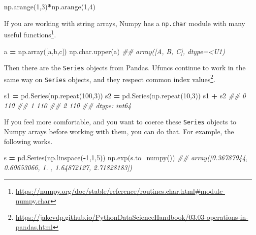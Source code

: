 \documentclass[
  12pt,
  krantz2]{krantz}
\makeatletter
\newenvironment{Shaded}{\begin{snugshade}}{\end{snugshade}}
\newcommand{\CommentTok}[1]{\textcolor[rgb]{0.37,0.37,0.37}{\textit{#1}}}
\newcommand{\DecValTok}[1]{\textcolor[rgb]{0.06,0.06,0.06}{#1}}
\newcommand{\NormalTok}[1]{#1}
\newcommand{\OperatorTok}[1]{\textcolor[rgb]{0.43,0.43,0.43}{\textbf{#1}}}
\newcommand{\StringTok}[1]{\textcolor[rgb]{0.5,0.5,0.5}{#1}}
\renewcommand{\href}[2]{#2\footnote{\url{#1}}}
\newenvironment{kframe}{%
\medskip{}
\setlength{\fboxsep}{.8em}
 \def\at@end@of@kframe{}%
 \ifinner\ifhmode%
  \def\at@end@of@kframe{\end{minipage}}%
  \begin{minipage}{\columnwidth}%
 \fi\fi%
 \def\FrameCommand##1{\hskip\@totalleftmargin \hskip-\fboxsep
 \colorbox{shadecolor}{##1}\hskip-\fboxsep
     \hskip-\linewidth \hskip-\@totalleftmargin \hskip\columnwidth}%
 \MakeFramed {\advance\hsize-\width
   \@totalleftmargin\z@ \linewidth\hsize
   \@setminipage}}%
 {\par\unskip\endMakeFramed%
 \at@end@of@kframe}
\renewenvironment{Shaded}{\begin{kframe}}{\end{kframe}}
\makeatother
\begin{document}
\begin{Shaded}
\begin{Highlighting}[]
\NormalTok{np.arange(}\DecValTok{1}\NormalTok{,}\DecValTok{3}\NormalTok{)}\OperatorTok{*}\NormalTok{np.arange(}\DecValTok{1}\NormalTok{,}\DecValTok{4}\NormalTok{)}
\end{Highlighting}
\end{Shaded}

If you are working with string arrays, Numpy has a \href{https://numpy.org/doc/stable/reference/routines.char.html\#module-numpy.char}{\texttt{np.char} module with many useful functions}.

\begin{Shaded}
\begin{Highlighting}[]
\NormalTok{a }\OperatorTok{=}\NormalTok{ np.array([}\StringTok{\textquotesingle{}a\textquotesingle{}}\NormalTok{,}\StringTok{\textquotesingle{}b\textquotesingle{}}\NormalTok{,}\StringTok{\textquotesingle{}c\textquotesingle{}}\NormalTok{])}
\NormalTok{np.char.upper(a)}
\CommentTok{\#\# array([\textquotesingle{}A\textquotesingle{}, \textquotesingle{}B\textquotesingle{}, \textquotesingle{}C\textquotesingle{}], dtype=\textquotesingle{}\textless{}U1\textquotesingle{})}
\end{Highlighting}
\end{Shaded}

Then there are the \texttt{Series} objects from Pandas. Ufuncs continue to work in the same way on \texttt{Series} objects, and they \href{https://jakevdp.github.io/PythonDataScienceHandbook/03.03-operations-in-pandas.html}{respect common index values}.

\begin{Shaded}
\begin{Highlighting}[]
\NormalTok{s1 }\OperatorTok{=}\NormalTok{ pd.Series(np.repeat(}\DecValTok{100}\NormalTok{,}\DecValTok{3}\NormalTok{))}
\NormalTok{s2 }\OperatorTok{=}\NormalTok{ pd.Series(np.repeat(}\DecValTok{10}\NormalTok{,}\DecValTok{3}\NormalTok{))}
\NormalTok{s1 }\OperatorTok{+}\NormalTok{ s2}
\CommentTok{\#\# 0    110}
\CommentTok{\#\# 1    110}
\CommentTok{\#\# 2    110}
\CommentTok{\#\# dtype: int64}
\end{Highlighting}
\end{Shaded}

If you feel more comfortable, and you want to coerce these \texttt{Series} objects to Numpy arrays before working with them, you can do that. For example, the following works.

\begin{Shaded}
\begin{Highlighting}[]
\NormalTok{s }\OperatorTok{=}\NormalTok{ pd.Series(np.linspace(}\OperatorTok{{-}}\DecValTok{1}\NormalTok{,}\DecValTok{1}\NormalTok{,}\DecValTok{5}\NormalTok{))}
\NormalTok{np.exp(s.to\_numpy())}
\CommentTok{\#\# array([0.36787944, 0.60653066, 1.        , 1.64872127, 2.71828183])}
\end{Highlighting}
\end{Shaded}
\end{document}
